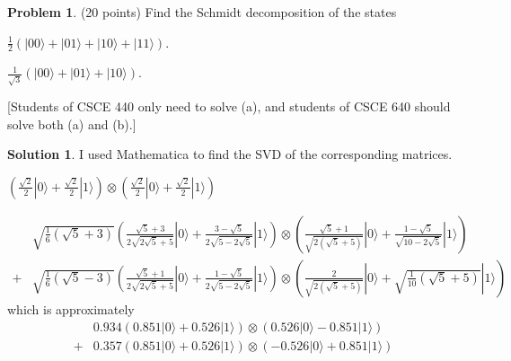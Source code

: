 \documentclass{article}
\theoremstyle{definition}
\newtheorem{problem}{Problem}
\newtheorem*{solution}{Solution}
\newcommand{\ket}[1]{|#1\rangle}
\begin{document}
\begin{problem}{(20 points)}
Find the Schmidt decomposition of the states 
\begin{compactenum}[(a)]
\item $ \frac{1}{2}\left( \ket{00} + \ket{01} + \ket{10} + \ket{11}
  \right)$.
\item $ \frac{1}{\sqrt{3}}\left( \ket{00} + \ket{01} + \ket{10}
  \right)$.
\end{compactenum}
[Students of CSCE 440 only need to solve (a), and students of CSCE 640
should solve both (a) and (b).] 
\end{problem}
\begin{solution}
I used Mathematica to find the SVD of the corresponding matrices.
\begin{compactenum}[(a)]
\item 
$(\frac{\sqrt{2}}{2} \ket{0} + \frac{\sqrt{2}}{2} \ket{1}) \otimes (\frac{\sqrt{2}}{2} \ket{0} + \frac{\sqrt{2}}{2} \ket{1})$
\item 
\begin{align*}
&  \sqrt{\frac{1}{6} \left(\sqrt{5}+3\right)} \left(\frac{\sqrt{5}+3}{2 \sqrt{2 \sqrt{5}+5}} \ket{0} + \frac{3-\sqrt{5}}{2 \sqrt{5-2 \sqrt{5}}} \ket{1}\right) 
       \otimes \left(\frac{\sqrt{5}+1}{\sqrt{2 \left(\sqrt{5}+5\right)}}\ket{0} + \frac{1-\sqrt{5}}{\sqrt{10-2 \sqrt{5}}} \ket{1}\right) 
\\ +  &  \sqrt{\frac{1}{6} \left(\sqrt{5}-3\right)} \left(\frac{\sqrt{5}+1}{2 \sqrt{2 \sqrt{5}+5}} \ket{0} + \frac{1-\sqrt{5}}{2 \sqrt{5-2 \sqrt{5}}} \ket{1} \right) 
       \otimes \left(\frac{2}{\sqrt{2 \left(\sqrt{5}+5\right)}}\ket{0} + \sqrt{\frac{1}{10} \left(\sqrt{5}+5\right)} \ket{1}\right)  
\end{align*}
which is approximately
\begin{align*}
& 0.934(0.851 \ket{0} + 0.526 \ket{1}) \otimes (0.526 \ket{0} -0.851 \ket{1})
\\ + &  0.357(0.851 \ket{0} + 0.526 \ket{1}) \otimes (-0.526 \ket{0} + 0.851 \ket{1})
\end{align*}
\end{compactenum}
\end{solution}
\end{document}
